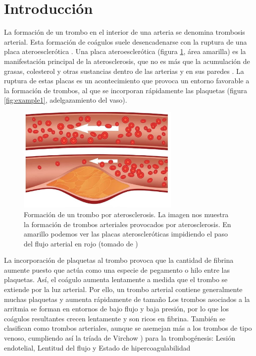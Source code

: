 \section{Introducción}

La formación de un trombo en el interior de una arteria se denomina trombosis arterial. Esta formación de coágulos suele desencadenarse con la ruptura de una placa ateroesclerótica \cite{Trombosis_Bayer}. Una placa ateroesclerótica (figura \ref{fig:Figura 1}, área amarilla) es la manifestación principal de la aterosclerosis, que no es más que la acumulación de grasas, colesterol y otras sustancias dentro de las arterias y en sus paredes \cite{Aterosclerosis_inflamacion}. La ruptura de estas placas es un acontecimiento que provoca un entorno favorable a la formación de trombos, al que se incorporan rápidamente las plaquetas (figura \ref{fig:example1}, adelgazamiento del vaso).

\begin{figure}[h]
    \centering
	\includegraphics[width=0.70\textwidth]{figures/aterosclerosis.jpg}
	\caption{Formación de un trombo por aterosclerosis. La imagen nos muestra la formación de trombos arteriales provocados por aterosclerosis. En amarillo podemos ver las placas ateroscleróticas impidiendo el paso del flujo arterial en rojo (tomado de \cite{imagen_trombo})}
	\label{fig:Figura 1}
  \end{figure}
  
La incorporación de plaquetas al trombo provoca que la cantidad de fibrina aumente puesto que actúa como una especie de pegamento o hilo entre las plaquetas. Así, el coágulo aumenta lentamente a medida que el trombo se extiende por la luz arterial. Por ello, un trombo arterial contiene generalmente muchas plaquetas y aumenta rápidamente de tamaño \cite{Aterosclerosis_inflamacion} \cite{Trombosis_Bayer}
Los trombos asociados a la arritmia se forman en entornos de bajo flujo y baja presión, por lo que los coágulos resultantes crecen lentamente y son ricos en fibrina. También se clasifican como trombos arteriales, aunque se asemejan más a los trombos de tipo venoso, cumpliendo así la tríada de Virchow \cite{Triada_Virchow}) para la trombogénesis: Lesión endotelial, Lentitud del flujo y Estado de hipercoagulabilidad
\\

